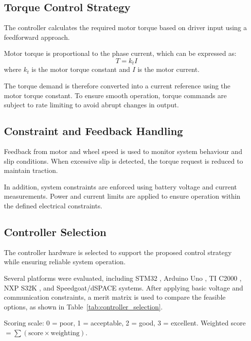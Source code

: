 \documentclass[11pt, a4paper]{report}
\numberwithin{equation}{section}
\begin{document}
\begin{refsection}
\subsection{Torque Control Strategy}
The controller calculates the required motor torque based on driver input using a feedforward approach.

Motor torque is proportional to the phase current, which can be expressed as:
\begin{equation}
T = k_t I
\end{equation}
where $k_t$ is the motor torque constant and $I$ is the motor current.

The torque demand is therefore converted into a current reference using the motor torque constant. To ensure smooth operation, torque commands are subject to rate limiting to avoid abrupt changes in output.
\subsection{Constraint and Feedback Handling}

Feedback from motor and wheel speed is used to monitor system behaviour and slip conditions. When excessive slip is detected, the torque request is reduced to maintain traction.

In addition, system constraints are enforced using battery voltage and current measurements. Power and current limits are applied to ensure operation within the defined electrical constraints.

\subsection{Controller Selection}

The controller hardware is selected to support the proposed control strategy while ensuring reliable system operation.

Several platforms were evaluated, including STM32\cite{stm32-nucleo-f4}
, Arduino Uno\cite{Arduino_uno_data_sheet}
, TI C2000\cite{TI_C200_data_sheet}
, NXP S32K\cite{NPX_S32K_data_sheet}
, and Speedgoat/dSPACE systems\cite{Speedgoat_data_sheet}.
After applying basic voltage and communication constraints, a merit matrix is used to compare the feasible options, as shown in Table~\ref{tab:controller_selection}.

\begin{table}[H]
\centering
\small
\renewcommand{\arraystretch}{1}
\setlength{\tabcolsep}{3pt}

\caption{Merit Matrix for Controller Selection}
\label{tab:controller_selection}
\small
Scoring scale: 0 = poor, 1 = acceptable, 2 = good, 3 = excellent.  
Weighted score $= \sum (\text{score} \times \text{weighting})$.
\end{table}
\end{refsection}
\end{document}
